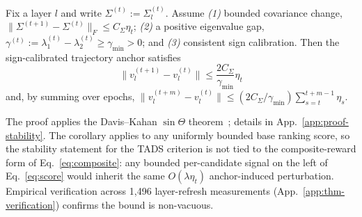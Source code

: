 \begin{theorem}
\label{thm:stability}
Fix a layer $l$ and write $\Sigma^{(t)} := \Sigma_l^{(t)}$. Assume
\emph{(1)} bounded covariance change,
$\|\Sigma^{(t+1)}-\Sigma^{(t)}\|_F \le C_\Sigma \eta_t$;
\emph{(2)} a positive eigenvalue gap,
$\gamma^{(t)} := \lambda_1^{(t)}-\lambda_2^{(t)}
\ge \gamma_{\min}>0$; and \emph{(3)} consistent sign calibration.
Then the sign-calibrated trajectory anchor satisfies
\begin{equation}
  \boxed{\bigl\|v_l^{(t+1)}-v_l^{(t)}\bigr\|
  \le \frac{2C_\Sigma}{\gamma_{\min}}\eta_t}
  \label{eq:stability-bound}
\end{equation}
and, by summing over epochs,
$\|v_l^{(t+m)}-v_l^{(t)}\| \le (2C_\Sigma/\gamma_{\min})
\sum_{s=t}^{t+m-1}\eta_s.$
\end{theorem}

The proof applies the Davis--Kahan $\sin\Theta$
theorem~\cite{daviskahan}; details in
App.~\ref{app:proof-stability}. The corollary applies to any
uniformly bounded base ranking score, so the stability statement
for the \textsc{TADS} criterion is not tied to the composite-reward
form of Eq.~\ref{eq:composite}: any bounded per-candidate signal
on the left of Eq.~\ref{eq:score} would inherit the same
$O(\lambda\eta_t)$ anchor-induced perturbation. Empirical
verification across 1{,}496 layer-refresh measurements
(App.~\ref{app:thm-verification}) confirms the bound is non-vacuous.
